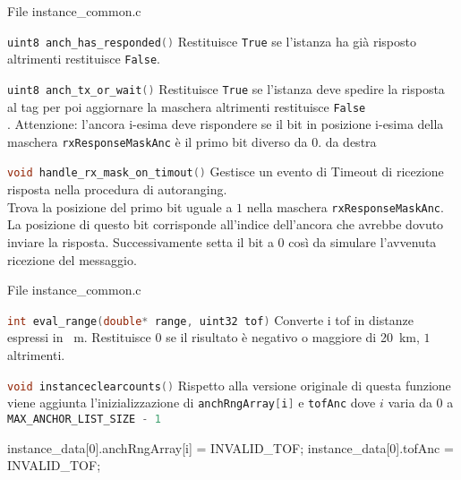 \begin{frame}[shrink = 10]{File instance\_common.c}%
  \begin{block}{\lstinline[language=C]!uint8 anch_has_responded()!}
    Restituisce \lstinline[language=C]!True! se l'istanza ha già risposto altrimenti restituisce \lstinline[language=C]!False!.
  \end{block}
  \begin{block}{\lstinline[language=C]!uint8 anch_tx_or_wait()!}
    Restituisce \lstinline[language=C]!True! se l'istanza deve spedire la risposta al tag per poi aggiornare la maschera altrimenti restituisce \lstinline[language=C]!False!\\.
    \textcolor{dgreen}{Attenzione:} l'ancora i-esima deve rispondere se il bit in posizione i-esima della maschera \lstinline[language=C]!rxResponseMaskAnc! è il primo bit diverso da $0$.
    da destra
  \end{block}
  \begin{block}{\lstinline[language=C]!void handle_rx_mask_on_timout()!}
    Gestisce un evento di Timeout di ricezione risposta nella procedura di autoranging.\\
    Trova la posizione del primo bit uguale a $1$ nella maschera \lstinline[language=C]!rxResponseMaskAnc!. La posizione di questo bit corrisponde all'indice dell'ancora che avrebbe
    dovuto inviare la risposta. Successivamente setta il bit a $0$ così da simulare l'avvenuta ricezione del messaggio.
  \end{block}
\end{frame}

\begin{frame}[fragile]{File instance\_common.c}
  \begin{block}{\lstinline[language=C]!int eval_range(double* range, uint32 tof)!}
    Converte i tof in distanze espressi in \SI{}{\meter}. Restituisce $0$ se il risultato è negativo o maggiore di \SI{20}{\kilo\meter}, 
    $1$ altrimenti.
  \end{block}
  \begin{block}{\lstinline[language=C]!void instanceclearcounts()!}
    Rispetto alla versione originale di questa funzione viene aggiunta l'inizializzazione di \lstinline[language=C]!anchRngArray[i]! e \lstinline[language=C]!tofAnc!
    dove $i$ varia da $0$ a \lstinline[language=C]!MAX_ANCHOR_LIST_SIZE - 1!
    \begin{C}
      instance_data[0].anchRngArray[i] = INVALID_TOF;
      instance_data[0].tofAnc = INVALID_TOF;
    \end{C}
  \end{block}
\end{frame}

